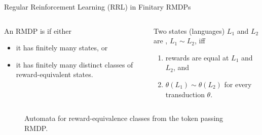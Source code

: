 \documentclass[
    hyperref = {hidelinks, linkcolor = black},
    xcolor = {dvipsnames},
    10pt
    aspectration = 169
]{beamer}
\begin{document}
    \begin{frame}{Regular Reinforcement Learning (RRL) in Finitary RMDPs}

        \vspace{15pt}

        \footnotesize

        \begin{columns}
            \begin{column}{0.5\linewidth}
                An RMDP is  if either
                \begin{itemize}
                    \item it has finitely many states, or
                    \item it has finitely many distinct classes of reward-equivalent states.
                \end{itemize}
            \end{column}
            \begin{column}{0.5\linewidth}
                Two states (languages) $L_1$ and $L_2$ are , $L_1 \sim L_2$, iff
               \begin{enumerate}
                    \item rewards are equal at $L_1$ and $L_2$, and
                    \item $\theta(L_1) \sim \theta(L_2)$ for every transduction $\theta$.
               \end{enumerate}
            \end{column}
        \end{columns}
        
        \vspace{10pt}

        \small



        \begin{figure}
            \caption{\color{teal} \footnotesize Automata for reward-equivalence classes from the token passing RMDP.}


\end{figure}
\end{frame}
\end{document}
